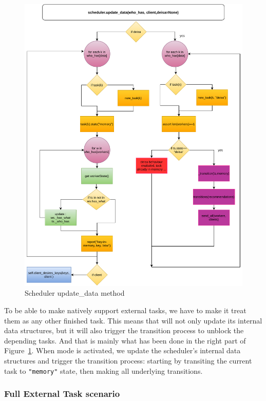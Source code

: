 \begin{figure}\centering
\includegraphics[scale=0.65]{figures/scheduler_update_data().pdf}
\caption{Scheduler update\_data method}
\label{figsceculerupdatedata}
\end{figure}

To be able to make \dask natively support external tasks, we have to make it treat them as any other finished task. This means that \dask will not only update its internal data structures, but it will also trigger the transition process to unblock the depending tasks.  And that is mainly what has been done in the right part of Figure~\ref{figsceculerupdatedata}. When \deisa mode is activated, we update the scheduler's internal data structures and trigger the transition process: starting by transiting the current task to \texttt{"memory"} state, then making all underlying transitions.    


\subsubsection{Full External Task scenario}


